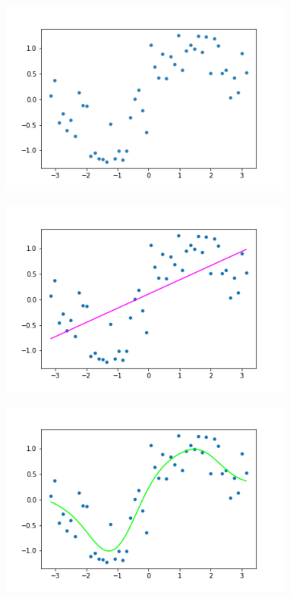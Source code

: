 \documentclass[a4paper,11pt,twoside]{article}
\begin{document}
\begin{figure} [h!]
  \centering
  \begin{subfigure}[b]{0.32\textwidth}
    \includegraphics[width=\textwidth]{wavey.png}
    \label{fig:4}
  \end{subfigure}
  \begin{subfigure}[b]{0.32\textwidth}
    \includegraphics[width=\textwidth]{wavey_lr.png}
    \label{fig:5}
  \end{subfigure}
  \begin{subfigure}[b]{0.32\textwidth}
    \includegraphics[width=\textwidth]{wavey_kr.png}
    \label{fig:6}
  \end{subfigure}
  \label{fig:7}
\end{figure}
\end{document}
